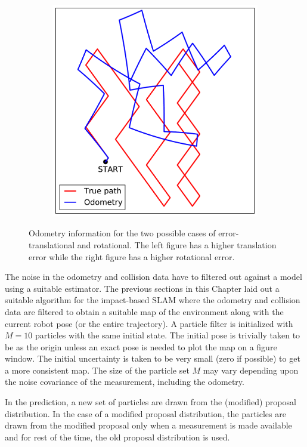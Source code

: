 \begin{figure}
\begin{subfigure}{0.47\textwidth}
\includegraphics[scale=0.45]{./images/odom_error2}
\caption{}
\label{odom_error2}
\end{subfigure}
\caption[Odometry information in simulation]{Odometry information for the two possible cases of error- translational and rotational. The left figure has a higher translation error while the right figure has a higher rotational error.}
\label{odom_simulation}
\end{figure} 

The noise in the odometry and collision data have to filtered out against a model using a suitable estimator. The previous sections in this Chapter laid out a suitable algorithm for the impact-based SLAM where the odometry and collision data are filtered to obtain a suitable map of the environment along with the current robot pose (or the entire trajectory). A particle filter is initialized with $M=10$ particles with the same initial state. The initial pose is trivially taken to be as the origin unless an exact pose is needed to plot the map on a figure window. The initial uncertainty is taken to be very small (zero if possible) to get a more consistent map. The size of the particle set $M$ may vary depending upon the noise covariance of the measurement, including the odometry.

In the prediction, a new set of particles are drawn from the (modified) proposal distribution. In the case of a modified proposal distribution, the particles are drawn from the modified proposal only when a measurement is made available and for rest of the time, the old proposal distribution is used.

